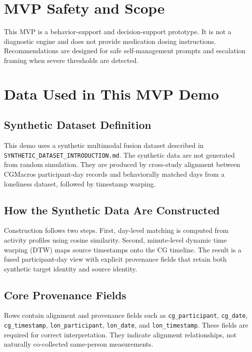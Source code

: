 \documentclass[11pt]{article}
\begin{document}
\section{MVP Safety and Scope}
This MVP is a behavior-support and decision-support prototype. It is not a diagnostic engine and does not provide medication dosing instructions. Recommendations are designed for safe self-management prompts and escalation framing when severe thresholds are detected.

\appendix
\section{Data Used in This MVP Demo}
\subsection{Synthetic Dataset Definition}
This demo uses a synthetic multimodal fusion dataset described in \texttt{SYNTHETIC\_DATASET\_INTRODUCTION.md}. The synthetic data are not generated from random simulation. They are produced by cross-study alignment between CGMacros participant-day records and behaviorally matched days from a loneliness dataset, followed by timestamp warping.

\subsection{How the Synthetic Data Are Constructed}
Construction follows two steps. First, day-level matching is computed from activity profiles using cosine similarity. Second, minute-level dynamic time warping (DTW) maps source timestamps onto the CG timeline. The result is a fused participant-day view with explicit provenance fields that retain both synthetic target identity and source identity.

\subsection{Core Provenance Fields}
Rows contain alignment and provenance fields such as \texttt{cg\_participant}, \texttt{cg\_date}, \texttt{cg\_timestamp}, \texttt{lon\_participant}, \texttt{lon\_date}, and \texttt{lon\_timestamp}. These fields are required for correct interpretation. They indicate alignment relationships, not naturally co-collected same-person measurements.
\end{document}
